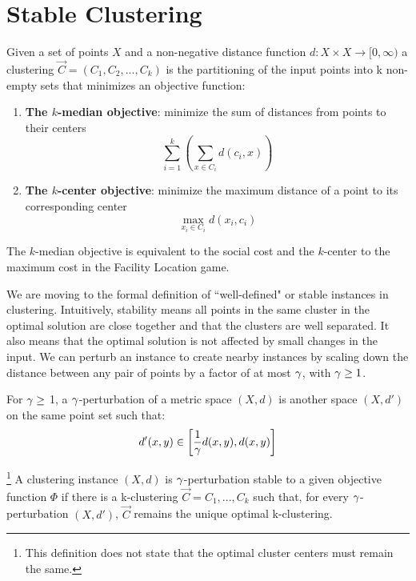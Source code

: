 

\section{Stable Clustering}


\begin{definition}[$k$-Clustering]
Given a set of points $X$ and a non-negative distance function $d: X\times X \rightarrow [ 0, \infty )$ a clustering $\vec{C} = (C_1,C_2,...,C_k)$ is the partitioning of the input points into k non-empty sets that minimizes an objective function:
\begin{enumerate}
    \item\textbf{The $k$-median objective}: minimize the sum of distances from points to their centers
    \[ \sum_{i=1}^{k} \left( \sum_{x\in C_i}  d(c_i,x)\right) \]
    \item\textbf{The $k$-center objective}: minimize the maximum distance of a point to its corresponding center
    \[ \max_{x_i \in C_i}  d(x_i,c_i)\]
\end{enumerate}
\end{definition}

The $k$-median objective is equivalent to the social cost and the $k$-center to the maximum cost in the Facility Location game. 
\bigskip

We are moving to the formal definition of ``well-defined" or stable instances in clustering. Intuitively, stability means all points in the same cluster in the optimal solution are close together and that the clusters are well separated. It also means that the optimal solution is not affected by small changes in the input. We can perturb an instance to create nearby instances by scaling down the distance between any pair of points by a factor of at most $\g$, with $\gamma \ge 1$. 
\begin{definition}[$\g$-perturbation]
For $\gamma \ge$  1, a $\g$-perturbation of a metric space $(X, d)$ is
another space $(X, d')$ on the same point set such that:
\[ d'(x,y) \in \left[\frac{1}{\gamma}d(x,y),d(x,y)\right] \]
\end{definition}


\begin{definition} \footnote{This definition does not state that the optimal cluster centers must remain the same.} 
A clustering instance $(X, d)$ is $\g$-perturbation stable to a given objective function $\Phi$ if there is a k-clustering $\vec{C}= C_1, . . . , C_k$ such that, for every $\g$-perturbation $(X, d')$, $\vec{C}$ remains the unique optimal k-clustering.
\end{definition}

